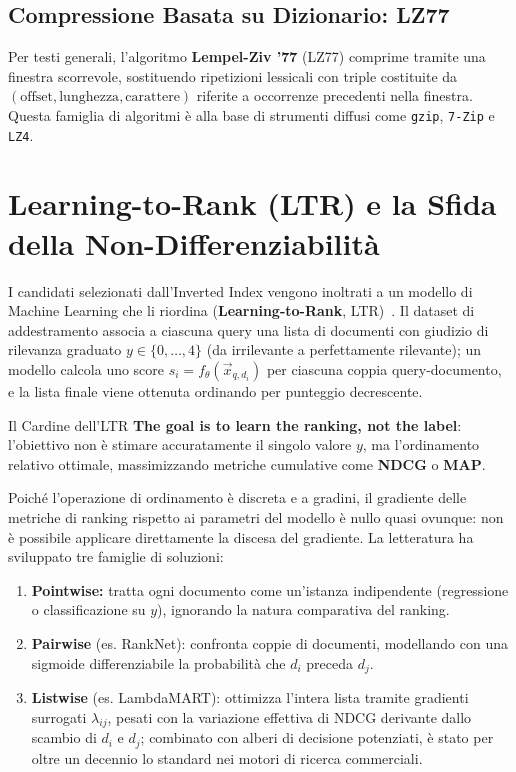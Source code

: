 \subsection{Compressione Basata su Dizionario: LZ77}
Per testi generali, l'algoritmo \textbf{Lempel-Ziv '77} (LZ77) comprime tramite una finestra scorrevole, sostituendo ripetizioni lessicali con triple costituite da $(\text{offset}, \text{lunghezza}, \text{carattere})$ riferite a occorrenze precedenti nella finestra. Questa famiglia di algoritmi \`e alla base di strumenti diffusi come \texttt{gzip}, \texttt{7-Zip} e \texttt{LZ4}.

\FloatBarrier
\section{Learning-to-Rank (LTR) e la Sfida della Non-Differenziabilit\`a}
\label{sec:ltr-sfida-non-differenziabilita}

I candidati selezionati dall'Inverted Index vengono inoltrati a un modello di Machine Learning che li riordina (\textbf{Learning-to-Rank}, LTR)~\cite{burges2010}. Il dataset di addestramento associa a ciascuna query una lista di documenti con giudizio di rilevanza graduato $y \in \{0,\dots,4\}$ (da irrilevante a perfettamente rilevante); un modello calcola uno score $s_i = f_\theta(\vec{x}_{q,d_i})$ per ciascuna coppia query-documento, e la lista finale viene ottenuta ordinando per punteggio decrescente.

\begin{alertblock}{Il Cardine dell'LTR}
\textbf{The goal is to learn the ranking, not the label}: l'obiettivo non \`e stimare accuratamente il singolo valore $y$, ma l'ordinamento relativo ottimale, massimizzando metriche cumulative come \textbf{NDCG} o \textbf{MAP}.
\end{alertblock}

Poich\'e l'operazione di ordinamento \`e discreta e a gradini, il gradiente delle metriche di ranking rispetto ai parametri del modello \`e nullo quasi ovunque: non \`e possibile applicare direttamente la discesa del gradiente. La letteratura ha sviluppato tre famiglie di soluzioni:
\begin{enumerate}
    \item \textbf{Pointwise:} tratta ogni documento come un'istanza indipendente (regressione o classificazione su $y$), ignorando la natura comparativa del ranking.
    \item \textbf{Pairwise} (es. RankNet): confronta coppie di documenti, modellando con una sigmoide differenziabile la probabilit\`a che $d_i$ preceda $d_j$.
    \item \textbf{Listwise} (es. LambdaMART): ottimizza l'intera lista tramite gradienti surrogati $\lambda_{ij}$, pesati con la variazione effettiva di NDCG derivante dallo scambio di $d_i$ e $d_j$; combinato con alberi di decisione potenziati, \`e stato per oltre un decennio lo standard nei motori di ricerca commerciali.
\end{enumerate}


